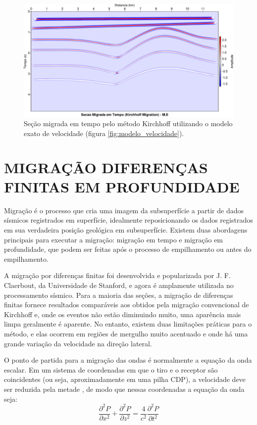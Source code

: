\begin{landscape}
\begin{figure}[H]
\centering
\includegraphics[totalheight=14cm]{figuras/cap3/seis_mig_time_ME.pdf}
\caption{Seção migrada em tempo pelo método Kirchhoff utilizando o modelo exato de velocidade (figura \ref{fig:modelo_velocidade}).}
\label{fig:seis_mig_time_ME}
\end{figure}
\end{landscape}

\section{MIGRAÇÃO DIFERENÇAS FINITAS EM PROFUNDIDADE}

Migração é o processo que cria uma imagem da subsuperfície a partir de dados sísmicos registrados em superfície, idealmente reposicionando os dados registrados em sua verdadeira posição geológica em subsuperfície. Existem duas abordagens principais para executar a migração: migração em tempo e migração em profundidade, que podem ser feitas após o processo de empilhamento ou antes do empilhamento.

A migração por diferenças finitas foi desenvolvida e popularizada por J. F. Claerbout, da Universidade de Stanford, e agora é amplamente utilizada no processamento sísmico. Para a maioria das seções, a migração de diferenças finitas fornece resultados comparáveis aos obtidos pela migração convencional de Kirchhoff e, onde os eventos não estão diminuindo muito, uma aparência mais limpa geralmente é aparente. No entanto, existem duas limitações práticas para o método, e elas ocorrem em regiões de mergulho muito acentuado e onde há uma grande variação da velocidade na direção lateral. \citep{HOOD(1978)}

O ponto de partida para a migração das ondas é normalmente a equação da onda escalar. Em um sistema de coordenadas em que o tiro e o receptor são coincidentes (ou seja, aproximadamente em uma pilha CDP), a velocidade deve ser reduzida pela metade \citep{Loewenthal(1976)}, de modo que nessas coordenadas a equação da onda seja:
\begin{equation}
\frac{\partial^{2} P}{\partial x^{2}}+\frac{\partial^{2} P}{\partial z^{2}}=\frac{4}{c^{2}} \frac{\partial^{2} P}{\partial t^{2}}
\label{eq:escalar_onda}
\end{equation}

